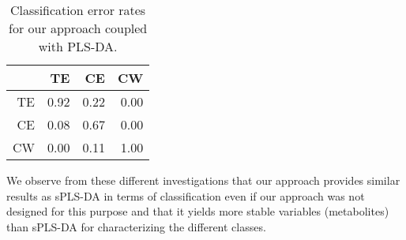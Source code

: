 \begin{table}[ht]
\centering
\begin{tabular}{rrrr}
  \hline
 & TE & CE & CW \\ 
  \hline
TE & 0.92 & 0.22 & 0.00 \\ 
  CE & 0.08 & 0.67 & 0.00 \\ 
  CW & 0.00 & 0.11 & 1.00 \\ 
   \hline
\end{tabular}
\caption{Classification error rates for our approach coupled with PLS-DA.\label{table:CV_er_our_plsda}}
\end{table}

We observe from these different investigations that our approach provides similar results as sPLS-DA in terms of classification even if our approach was not designed for this purpose and that 
it yields more stable variables (metabolites) than sPLS-DA for characterizing the different classes.

